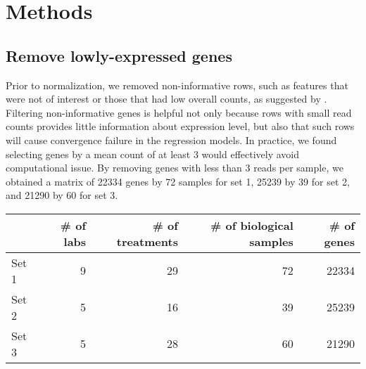 \documentclass[11pt, a4paper]{article}
\begin{document}
\section{Methods}
\subsection{Remove lowly-expressed genes} Prior to normalization, we removed non-informative rows, such as features that were not of interest or those that had low overall counts, as suggested by \cite{anders2013count}. Filtering non-informative genes is helpful not only because rows with small read counts provides little information about expression level,  but also that such rows will cause convergence failure in the regression models. In practice,  we found selecting genes by a mean count of at least 3 would effectively avoid computational issue.  By removing genes with less than 3 reads per sample, we obtained a matrix of 22334 genes by 72 samples for set 1, 25239 by 39 for set 2, and 21290 by 60  for set 3.  

\begin{table}[h]
\centering
\begin{tabular}{lrrrr} \hline
& \# of labs & \# of treatments  & \# of biological samples & \# of genes \\ \hline
Set 1 &9 & 29 &72  &22334  \\
Set 2 &5 & 16 & 39 &25239  \\
Set 3 &5 &28  &60  & 21290\\ \hline
\end{tabular}
\end{table}

\end{document}
